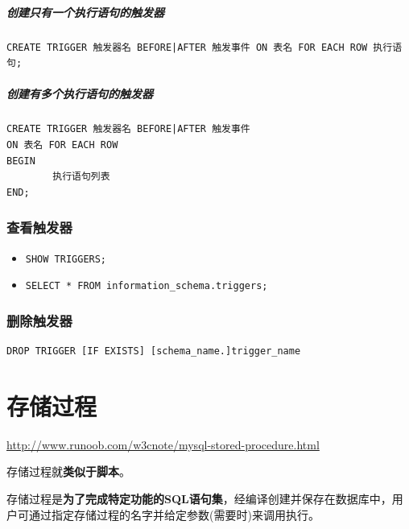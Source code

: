 \documentclass[UTF8,a4paper,12pt]{ctexbook}
\begin{document}
			
			\paragraph{创建只有一个执行语句的触发器}
				\begin{lstlisting}
CREATE TRIGGER 触发器名 BEFORE|AFTER 触发事件 ON 表名 FOR EACH ROW 执行语句;				
				\end{lstlisting}
			
			\paragraph{创建有多个执行语句的触发器}
				\begin{lstlisting}
CREATE TRIGGER 触发器名 BEFORE|AFTER 触发事件
ON 表名 FOR EACH ROW
BEGIN
        执行语句列表
END;				
				\end{lstlisting}
		
		
		\subsection{查看触发器}	
			\begin{itemize}
				\item \verb|SHOW TRIGGERS;|
				\item \verb|SELECT * FROM information_schema.triggers;|
			\end{itemize}
			
			
		\subsection{删除触发器}
			\begin{lstlisting}
DROP TRIGGER [IF EXISTS] [schema_name.]trigger_name
			\end{lstlisting}


\chapter{存储过程}
	\url{http://www.runoob.com/w3cnote/mysql-stored-procedure.html}
	
	存储过程就\textbf{类似于脚本}。
	
	存储过程是\textbf{为了完成特定功能的SQL语句集}，经编译创建并保存在数据库中，用户可通过指定存储过程的名字并给定参数(需要时)来调用执行。
	
\end{document}
